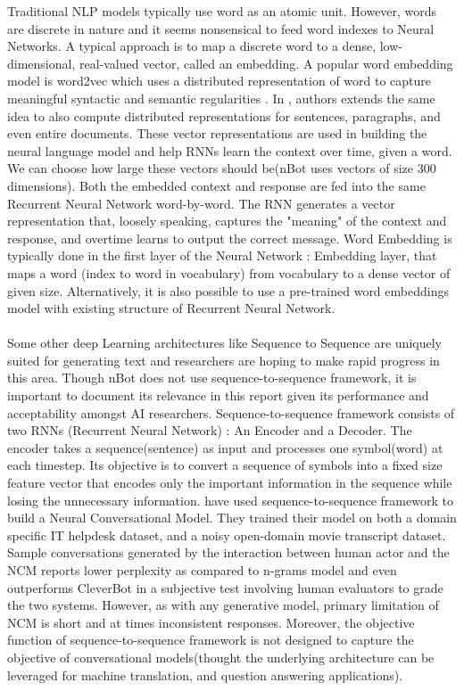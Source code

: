 \documentclass[letterpaper] {article} %
\begin{document}
Traditional NLP models typically use word as an atomic unit. However, words are discrete in nature and it seems nonsensical to feed word indexes to Neural Networks. A typical approach is to map a discrete word to a dense, low-dimensional, real-valued vector, called an embedding. A popular word embedding model is word2vec which uses a distributed representation of word to capture meaningful syntactic and semantic regularities \cite{mikolov2013efficient} \cite{mikolov2013distributed} \cite{mikolov2013linguistic}. In \cite{le2014distributed}, authors  extends the same idea to also compute distributed representations for sentences, paragraphs, and even entire documents. These vector representations are used in building the neural language model and help RNNs learn the context over time, given a word. We can choose how large these vectors should be(nBot uses vectors of size 300 dimensions). Both the embedded context and response are fed into the same Recurrent Neural Network word-by-word. The RNN generates a vector representation that, loosely speaking, captures the "meaning" of the context and response, and overtime learns to output the correct message. Word Embedding is typically done in the first layer of the Neural Network : Embedding layer, that maps a word (index to word in vocabulary) from vocabulary to a dense vector of given size. Alternatively, it is also possible to use a pre-trained word embeddings model with existing structure of Recurrent Neural Network.
\\\\
Some other deep Learning architectures like Sequence to Sequence\cite{sutskever2014sequence} are uniquely suited for generating text and researchers are hoping to make rapid progress in this area. Though nBot does not use sequence-to-sequence framework, it is important to document its relevance in this report given its performance and acceptability amongst AI researchers. Sequence-to-sequence framework consists of two RNNs (Recurrent Neural Network) : An Encoder and a Decoder. The encoder takes a sequence(sentence) as input and processes one symbol(word) at each timestep. Its objective is to convert a sequence of symbols into a fixed size feature vector that encodes only the important information in the sequence while losing the unnecessary information. \cite{vinyals2015neural} have used sequence-to-sequence framework to build a Neural Conversational Model. They trained their model on both a domain specific IT helpdesk dataset, and  a noisy open-domain movie transcript dataset. Sample conversations generated by the interaction between human actor and the NCM reports lower perplexity as compared to n-grams model and even outperforms CleverBot in a subjective test involving human evaluators to grade the two systems. However, as with any generative model, primary limitation of NCM is short and at times inconsistent responses. Moreover, the objective function of sequence-to-sequence framework is not designed to capture the objective of conversational models(thought the underlying architecture can be leveraged for machine translation, and question answering applications).
\end{document}
